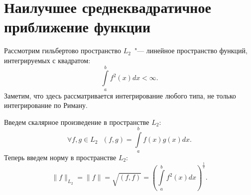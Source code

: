 \documentclass[11pt,a4paper,twoside]{report}
\numberwithin{equation}{section}
\theoremstyle{definition}
\theoremstyle{plain}
\begin{document}
\section{Наилучшее среднеквадратичное приближение функции}
%

Рассмотрим гильбертово пространство $L_2$~"--- линейное
пространство функций, интегрируемых с квадратом:
%
$$
    \int\limits_a^b{f^2(x)dx} < \infty.
$$
%
Заметим, что здесь рассматривается интегрирование любого типа, не только
интегрирование по Риману.

Введем скалярное произведение в пространстве $L_2$:
%
$$
    \forall f,g \in L_2 ~~~(f,g)=\int\limits_a^b{f(x)g(x)dx}.
$$
%
Теперь введем норму в пространстве $L_2$:
%
$$
    \|f\|_{L_2}=\|f\|=\sqrt{(f,f)}=
    \left(\int\limits_a^b{f^2(x)dx}\right)^{\frac{1}{2}}.
$$
%
\end{document}
